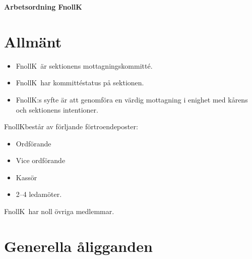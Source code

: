 

\renewcommand{\dateseparator}{-} %

\renewcommand{\forening}{FnollK}

\begin{center}
\LARGE{\textbf{Arbetsordning \forening}}
\end{center}

\section{Allmänt}
\begin{itemize}
\item \forening \ är sektionens mottagningskommitté.

\item \forening \ har kommittéstatus på sektionen.

\item \forening:s syfte är att genomföra en värdig mottagning i enighet med kårens och sektionens intentioner. 
\end{itemize}


\forening består av förljande förtroendeposter:
\begin{itemize}
\item Ordförande
\item Vice ordförande
\item Kassör
\item 2--4 ledamöter.
\end{itemize}

\forening \ har noll övriga medlemmar.


\section{Generella åligganden}

